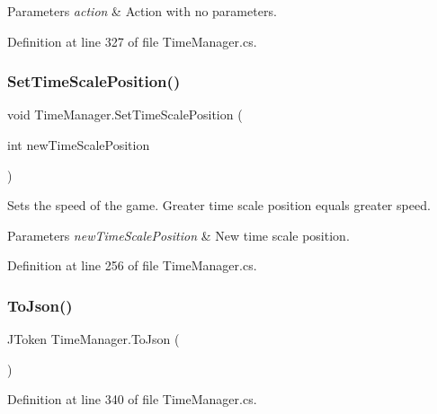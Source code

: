 \begin{DoxyParams}{Parameters}
{\em action} & Action with no parameters.\\
\hline
\end{DoxyParams}


Definition at line 327 of file Time\+Manager.\+cs.

\mbox{\label{class_time_manager_a13fc95a140feaa5b8dae1b56c9de647e}} 
\subsubsection{\texorpdfstring{Set\+Time\+Scale\+Position()}{SetTimeScalePosition()}}
{\footnotesize\ttfamily void Time\+Manager.\+Set\+Time\+Scale\+Position (\begin{DoxyParamCaption}\item[{int}]{new\+Time\+Scale\+Position }\end{DoxyParamCaption})}



Sets the speed of the game. Greater time scale position equals greater speed. 


\begin{DoxyParams}{Parameters}
{\em new\+Time\+Scale\+Position} & New time scale position.\\
\hline
\end{DoxyParams}


Definition at line 256 of file Time\+Manager.\+cs.

\mbox{\label{class_time_manager_ad65e1163a2aea49194d3fbad7a764403}} 
\subsubsection{\texorpdfstring{To\+Json()}{ToJson()}}
{\footnotesize\ttfamily J\+Token Time\+Manager.\+To\+Json (\begin{DoxyParamCaption}{ }\end{DoxyParamCaption})}



Definition at line 340 of file Time\+Manager.\+cs.

